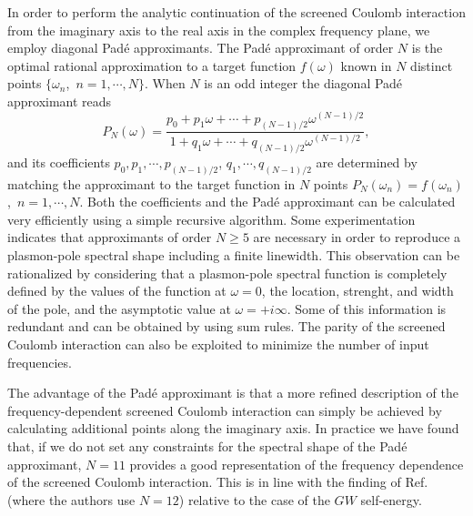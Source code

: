 \documentclass[twocolumn,prb,showpacs,superscriptaddress]{revtex4}
\def\w{\omega}
\begin{document}
In order to perform the analytic continuation of the screened Coulomb interaction
from the imaginary axis to the real axis in the complex frequency plane, we employ diagonal 
Pad\'e approximants.\cite{pade1,pade2,blochl}
The Pad\'e approximant of order $N$ is the optimal rational approximation
to a target function $f(\w)$ known in $N$ distinct points 
$\{\w_n$,~$n=1,\cdots,N\}$. 
When $N$ is an odd integer the diagonal Pad\'e approximant reads
  \begin{equation}
  P_N(\w) = \frac{p_0+p_1\w+\cdots+p_{(N-1)/2}\w^{(N-1)/2}}
  {1+q_1\w+\cdots+q_{(N-1)/2}\w^{(N-1)/2}},
  \end{equation}
and its coefficients $p_0, p_1, \cdots, p_{(N-1)/2}$, $q_1, \cdots, q_{(N-1)/2}$ are determined by matching the approximant
to the target function in $N$ points $P_N(\w_n)=f(\w_n)$,~$n=1,\cdots,N$.
Both the coefficients and the Pad\'e approximant can be calculated
very efficiently using a simple recursive algorithm.\cite{pade2}
Some experimentation indicates that approximants of order $N\ge5$ are necessary
in order to reproduce a plasmon-pole spectral shape including a finite linewidth.
This observation can be rationalized by considering that a plasmon-pole
spectral function is completely defined by the values of the function at $\w=0$,
the location, strenght, and width of the pole, and the asymptotic value at $\w=+i\infty$.
Some of this information is redundant and can be obtained by using sum rules.\cite{hl86}
The parity of the screened Coulomb interaction can also be exploited to minimize
the number of input frequencies. 

The advantage of the Pad\'e approximant is that a more refined description
of the frequency-dependent screened Coulomb interaction can simply be achieved
by calculating additional points along the imaginary axis. In practice
we have found that, if we do not set any constraints for the spectral
shape of the Pad\'e approximant, $N=11$ provides a good representation of the frequency
dependence of the screened Coulomb interaction. This is in line with the finding 
of Ref.\  (where the authors use $N=12$) relative to the
case of the $GW$ self-energy. 
\end{document}
